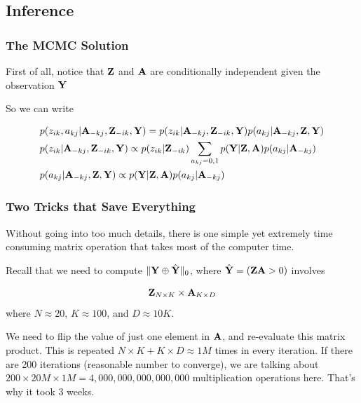 \documentclass{beamer}
\newcommand{\A}{{\bf A}}
\newcommand{\Y}{{\bf Y}}
\newcommand{\Z}{{\bf Z}}
\begin{document}
\subsection{Inference}
\begin{frame}
\frametitle{The MCMC Solution}
First of all, notice that $\Z$ and $\A$ are conditionally independent given the observation $\Y$

\begin{figure}[h]
\centering
{}
\end{figure}

So we can write

\fontsize{8pt}{7.2}\selectfont
\begin{align}	
	&p(z_{ik}, a_{kj}|\A_{-kj},\Z_{-ik},\Y) = p(z_{ik}|\A_{-kj},\Z_{-ik},\Y) p(a_{kj}|\A_{-kj},\Z,\Y) \\
	&p(z_{ik}|\A_{-kj},\Z_{-ik},\Y) \propto p(z_{ik}|\Z_{-ik}) \sum_{a_{kj}={0,1}} p(\Y|\Z, \A) p(a_{kj}|\A_{-kj}) \\
	&p(a_{kj}|\A_{-kj},\Z,\Y) \propto p(\Y|\Z, \A) p(a_{kj}|\A_{-kj})
\end{align}

\end{frame}

\begin{frame}
\frametitle{Two Tricks that Save Everything}
Without going into too much details, there is one simple yet extremely time consuming matrix operation that takes most of the computer time.

\vspace{0.1in}
Recall that we need to compute $\|\Y \oplus \hat\Y\|_0$, where $\hat\Y = (\Z\A > 0)$ involves

$$\Z_{N \times K} \times \A_{K \times D}$$ where $N \approx 20$, $K \approx 100$, and $D \approx 10K$.

\vspace{0.1in}
\fontsize{8pt}{7.2}\selectfont
We need to flip the value of just one element in $\A$, and re-evaluate this matrix product. This is repeated $N \times K + K \times D \approx 1M$ times in every iteration. If there are 200 iterations (reasonable number to converge), we are talking about $200 \times 20M \times 1M = 4,000,000,000,000,000$ multiplication operations here. That's why it took 3 weeks.


\end{frame}
\end{document}
